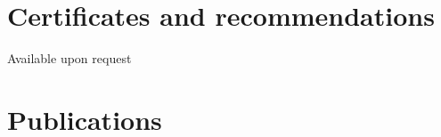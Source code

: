 \documentclass[margin,line]{res}
\begin{document}
\begin{resume}
\section{\sc Certificates and recommendations}
Available upon request

\section{\sc Publications}
\renewcommand\refname{}
\nocite{*}


\end{resume}
\end{document}
